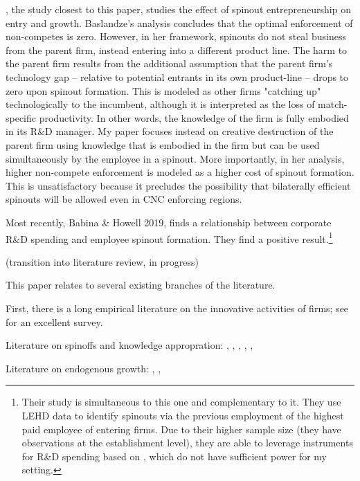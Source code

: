 \documentclass[11pt,english]{article}
\theoremstyle{remark}
\begin{document}
\cite{baslandze_spinout_2019}, the study closest to this paper, studies the effect of spinout entrepreneurship on entry and growth. Baslandze's analysis concludes that the optimal enforcement of non-competes is zero. However, in her framework, spinouts do not steal business from the parent firm, instead entering into a different product line. The harm to the parent firm results from the additional assumption that the parent firm's technology gap -- relative to potential entrants in its own product-line -- drops to zero upon spinout formation. This is modeled as other firms "catching up" technologically to the incumbent, although it is interpreted as the loss of match-specific productivity. In other words, the knowledge of the firm is fully embodied in its R\&D manager. My paper focuses instead on creative destruction of the parent firm using knowledge that is embodied in the firm but can be used simultaneously by the employee in a spinout.  More importantly, in her analysis, higher non-compete enforcement is modeled as a higher cost of spinout formation. This is unsatisfactory because it precludes the possibility that bilaterally efficient spinouts will be allowed even in CNC enforcing regions. 

Most recently, Babina \& Howell 2019, finds a relationship between corporate R\&D spending and employee spinout formation. They find a positive result.\footnote{Their study is simultaneous to this one and complementary to it. They use LEHD data to identify spinouts via the previous employment of the highest paid employee of entering firms. Due to their higher sample size (they have observations at the establishment level), they are able to leverage instruments for R\&D spending based on \cite{bloom_identifying_2013}, which do not have sufficient power for my setting.}

(transition into literature review, in progress)

This paper relates to several existing branches of the literature. 

First, there is a long empirical literature on the innovative activities of firms; see \cite{cohen_fifty_2010} for an excellent survey.

Literature on spinoffs and knowledge appropration: \cite{anton_expropriation_1994}, \cite{anton_start-ups_1995}, \cite{franco_covenants_2008}, \cite{klepper_entry_2005}, \cite{klette_innovating_2004}, \cite{chatterjee_spinoffs_2012}

Literature on endogenous growth: \cite{grossman_quality_1991}, \cite{romer_increasing_1986}, \cite{aghion_model_1992}
\end{document}
